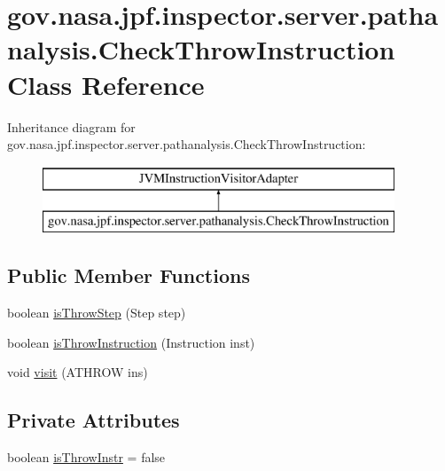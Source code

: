 \hypertarget{classgov_1_1nasa_1_1jpf_1_1inspector_1_1server_1_1pathanalysis_1_1_check_throw_instruction}{}\section{gov.\+nasa.\+jpf.\+inspector.\+server.\+pathanalysis.\+Check\+Throw\+Instruction Class Reference}
\label{classgov_1_1nasa_1_1jpf_1_1inspector_1_1server_1_1pathanalysis_1_1_check_throw_instruction}
Inheritance diagram for gov.\+nasa.\+jpf.\+inspector.\+server.\+pathanalysis.\+Check\+Throw\+Instruction\+:\begin{figure}[H]
\begin{center}
\leavevmode
\includegraphics[height=2.000000cm]{classgov_1_1nasa_1_1jpf_1_1inspector_1_1server_1_1pathanalysis_1_1_check_throw_instruction}
\end{center}
\end{figure}
\subsection*{Public Member Functions}
\begin{DoxyCompactItemize}
\item 
boolean \hyperlink{classgov_1_1nasa_1_1jpf_1_1inspector_1_1server_1_1pathanalysis_1_1_check_throw_instruction_a2e5128dbf1ddfef7f9ae48da9698fd81}{is\+Throw\+Step} (Step step)
\item 
boolean \hyperlink{classgov_1_1nasa_1_1jpf_1_1inspector_1_1server_1_1pathanalysis_1_1_check_throw_instruction_a1e8150ac5d6819397a033121ba37d323}{is\+Throw\+Instruction} (Instruction inst)
\item 
void \hyperlink{classgov_1_1nasa_1_1jpf_1_1inspector_1_1server_1_1pathanalysis_1_1_check_throw_instruction_aef04719590d6cfcfca31d3f8a3c2df5d}{visit} (A\+T\+H\+R\+OW ins)
\end{DoxyCompactItemize}
\subsection*{Private Attributes}
\begin{DoxyCompactItemize}
\item 
boolean \hyperlink{classgov_1_1nasa_1_1jpf_1_1inspector_1_1server_1_1pathanalysis_1_1_check_throw_instruction_af52802d8cf48a895650333b696ab53a4}{is\+Throw\+Instr} = false
\end{DoxyCompactItemize}


